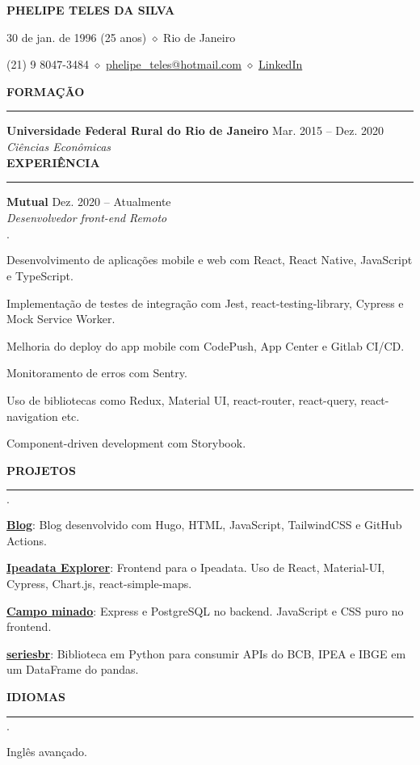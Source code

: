 \documentclass[11pt,letterpaper]{article}
\begin{document}
\centerline{\MakeUppercase{\huge\bf Phelipe Teles da Silva}}
\medskip

\centerline{30 de jan. de 1996 (25 anos) $\diamond$ Rio de Janeiro}
\smallskip

\centerline{
  (21) 9 8047-3484 $\diamond$
  \href{mailto:phelipe_teles@hotmail.com}{phelipe\_teles@hotmail.com} $\diamond$ \href{https://linkedin.com/in/phelipeteles}{LinkedIn}
}
\smallskip

\medskip \textbf{FORMAÇÃO} \medskip
\hrule

\textbf{Universidade Federal Rural do Rio de Janeiro} \hfill {Mar. 2015 -- Dez. 2020} \\
\emph{Ciências Econômicas} \hfill \\

\medskip \textbf{EXPERIÊNCIA} \medskip
\hrule

\textbf{Mutual} \hfill Dez. 2020 -- Atualmente \\
\emph{Desenvolvedor front-end} \hfill \emph{Remoto} \\

\vspace*{-\baselineskip}

\begin{list}
{$\cdot$}
{
\setlength{\leftmargin}{0em}
\setlength{\itemsep}{-0.5em}
}
  \item Desenvolvimento de aplicações mobile e web com React, React Native,
    JavaScript e TypeScript.
  \item Implementação de testes de integração com Jest, react-testing-library,
    Cypress e Mock Service Worker.
  \item Melhoria do deploy do app mobile com CodePush, App Center e Gitlab CI/CD.
  \item Monitoramento de erros com Sentry.
  \item Uso de bibliotecas como Redux, Material UI, react-router, react-query,
    react-navigation etc.
  \item Component-driven development com Storybook.
\end{list}

\medskip \textbf{PROJETOS} \medskip
\hrule

\begin{list}
{$\cdot$}
{
\setlength{\leftmargin}{0em}
\setlength{\itemsep}{-0.5em}
}
 \item \href{https://phelipetls.github.io}{\textbf{Blog}}: Blog desenvolvido com
   Hugo, HTML, JavaScript, TailwindCSS e GitHub Actions.
 \item \href{http://ipeadata-explorer.surge.sh}{\textbf{Ipeadata Explorer}}:
   Frontend para o Ipeadata. Uso de React, Material-UI, Cypress, Chart.js,
   react-simple-maps.
 \item \href{https://github.com/phelipetls/minesweeper.js}{\textbf{Campo minado}}:
   Express e PostgreSQL no backend. JavaScript e CSS puro no frontend.
 \item \href{https://github.com/phelipetls/seriesbr}{\textbf{seriesbr}}:
   Biblioteca em Python para consumir APIs do BCB, IPEA e IBGE em um DataFrame
   do pandas.
\end{list}

\medskip \textbf{IDIOMAS} \medskip
\hrule

\begin{list}
{$\cdot$}
{
\setlength{\leftmargin}{0em}
\setlength{\itemsep}{-0.5em}
}
  \item Inglês avançado.
\end{list}
\end{document}
